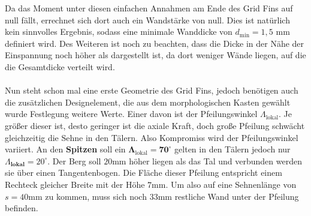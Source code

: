 Da das Moment unter diesen einfachen Annahmen am Ende des Grid Fins auf null fällt, errechnet sich dort auch ein Wandstärke von null. Dies ist natürlich kein sinnvolles Ergebnis, sodass eine minimale Wanddicke von $d_\mathrm{min}=1,5$ mm definiert wird. Des Weiteren ist noch zu beachten, dass die Dicke in der Nähe der Einspannung noch höher als dargestellt ist, da dort weniger Wände liegen, auf die die Gesamtdicke verteilt wird.
\\~\\
Nun steht schon mal eine erste Geometrie des Grid Fins, jedoch benötigen auch die zusätzlichen Designelement, die aus dem morphologischen Kasten gewählt wurde Festlegung weitere Werte. Einer davon ist der Pfeilungswinkel $\Lambda_\mathrm{lokal}$. Je größer dieser ist, desto geringer ist die axiale Kraft, doch große Pfeilung schwächt gleichzeitig die Sehne in den Tälern. Also Kompromiss wird der Pfeilungswinkel variiert. An den \textbf{Spitzen} soll ein $\mathbf{\Lambda_\mathrm{lokal}=70^\circ}$ gelten in den Tälern jedoch nur $\Lambda_\mathrm{\textbf{lokal}}=20^\circ$. Der Berg soll $20$mm höher liegen als das Tal und verbunden werden sie über einen Tangentenbogen. Die Fläche dieser Pfeilung entspricht einem Rechteck gleicher Breite mit der Höhe $7$mm. Um also auf eine Sehnenlänge von $s=40$mm zu kommen, muss sich noch $33$mm restliche Wand unter der Pfeilung befinden.

